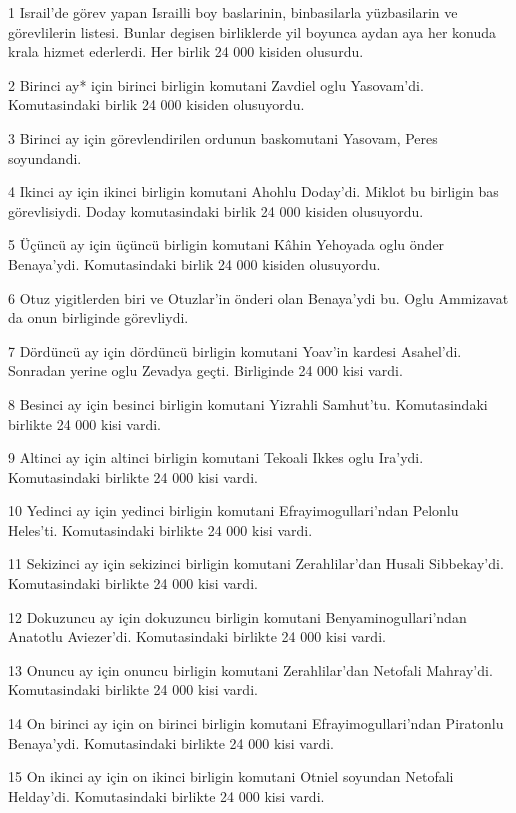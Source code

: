 \par 1 Israil'de görev yapan Israilli boy baslarinin, binbasilarla yüzbasilarin ve görevlilerin listesi. Bunlar degisen birliklerde yil boyunca aydan aya her konuda krala hizmet ederlerdi. Her birlik 24 000 kisiden olusurdu.
\par 2 Birinci ay* için birinci birligin komutani Zavdiel oglu Yasovam'di. Komutasindaki birlik 24 000 kisiden olusuyordu.
\par 3 Birinci ay için görevlendirilen ordunun baskomutani Yasovam, Peres soyundandi.
\par 4 Ikinci ay için ikinci birligin komutani Ahohlu Doday'di. Miklot bu birligin bas görevlisiydi. Doday komutasindaki birlik 24 000 kisiden olusuyordu.
\par 5 Üçüncü ay için üçüncü birligin komutani Kâhin Yehoyada oglu önder Benaya'ydi. Komutasindaki birlik 24 000 kisiden olusuyordu.
\par 6 Otuz yigitlerden biri ve Otuzlar'in önderi olan Benaya'ydi bu. Oglu Ammizavat da onun birliginde görevliydi.
\par 7 Dördüncü ay için dördüncü birligin komutani Yoav'in kardesi Asahel'di. Sonradan yerine oglu Zevadya geçti. Birliginde 24 000 kisi vardi.
\par 8 Besinci ay için besinci birligin komutani Yizrahli Samhut'tu. Komutasindaki birlikte 24 000 kisi vardi.
\par 9 Altinci ay için altinci birligin komutani Tekoali Ikkes oglu Ira'ydi. Komutasindaki birlikte 24 000 kisi vardi.
\par 10 Yedinci ay için yedinci birligin komutani Efrayimogullari'ndan Pelonlu Heles'ti. Komutasindaki birlikte 24 000 kisi vardi.
\par 11 Sekizinci ay için sekizinci birligin komutani Zerahlilar'dan Husali Sibbekay'di. Komutasindaki birlikte 24 000 kisi vardi.
\par 12 Dokuzuncu ay için dokuzuncu birligin komutani Benyaminogullari'ndan Anatotlu Aviezer'di. Komutasindaki birlikte 24 000 kisi vardi.
\par 13 Onuncu ay için onuncu birligin komutani Zerahlilar'dan Netofali Mahray'di. Komutasindaki birlikte 24 000 kisi vardi.
\par 14 On birinci ay için on birinci birligin komutani Efrayimogullari'ndan Piratonlu Benaya'ydi. Komutasindaki birlikte 24 000 kisi vardi.
\par 15 On ikinci ay için on ikinci birligin komutani Otniel soyundan Netofali Helday'di. Komutasindaki birlikte 24 000 kisi vardi.
